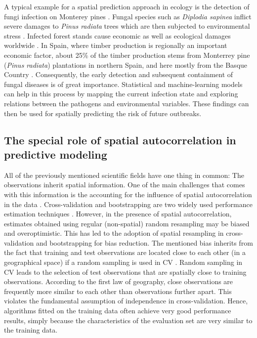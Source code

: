 \documentclass[review]{elsarticle}
\begin{document}
A typical example for a spatial prediction approach in ecology is the detection of fungi infection on Monterey pines \citep{Iturritxa2014}.
Fungal species such as \textit{Diplodia sapinea} inflict severe damages to \textit{Pinus radiata} trees which are then subjected to environmental stress \citep{Wingfield2008}.
Infected forest stands cause economic as well as ecological damages worldwide \citep{Ganley2009}.
In Spain, where timber production is regionally an important economic factor, about 25\% of the timber production stems from Monterrey pine (\textit{Pinus radiata}) plantations in northern Spain, and here mostly from the Basque Country \citep{Iturritxa2014}.
Consequently, the early detection and subsequent containment of fungal diseases is of great importance.
Statistical and machine-learning models can help in this process by mapping the current infection state and exploring relations between the pathogens and environmental variables.
These findings can then be used for spatially predicting the risk of future outbreaks.

\subsection{The special role of spatial autocorrelation in predictive modeling}
\label{subsec:spcv_pred_mod}
All of the previously mentioned scientific fields have one thing in common: The observations inherit spatial information.
One of the main challenges that comes with this information is the accounting for the influence of spatial autocorrelation in the data \citep{Legendre1993}.
Cross-validation and bootstrapping are two widely used performance estimation techniques \citep{Efron1983, Gordon1984, Kohavi1995}.
However, in the presence of spatial autocorrelation, estimates obtained using regular (non-spatial) random resampling may be biased and overoptimistic.
This has led to the adoption of spatial resampling in cross-validation and bootstrapping for bias reduction.
The mentioned bias inherits from the fact that training and test observations are located close to each other (in a geographical space) if a random sampling is used in \ac{CV} \citep{Legendre1993}.
Random sampling in CV leads to the selection of test observations that are spatially close to training observations. 
According to the first law of geography, close observations are frequently more similar to each other than observations further apart. 
This violates the fundamental assumption of independence in cross-validation.
Hence, algorithms fitted on the training data often achieve very good performance results, simply because the characteristics of the evaluation set are very similar to the training data.
\end{document}

